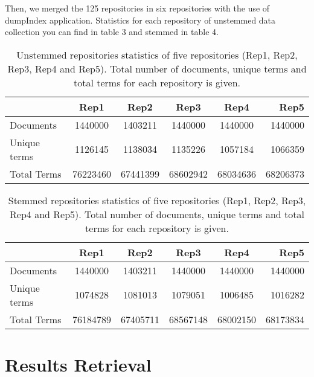 Then, we merged the 125 repositories in six repositories with the use of dumpIndex application. Statistics for each repository of unstemmed data collection you can find in table 3 and stemmed in table 4.




\begin{table}[H]
\begin{center}
\footnotesize
\caption{Unstemmed repositories statistics of five repositories (Rep1, Rep2, Rep3, Rep4 and Rep5). Total number of documents, unique terms and total terms for each repository is given.}
\begin{tabular}{lccccr}
\toprule
&Rep1 & Rep2 & Rep3 & Rep4 & Rep5 \\
\midrule
Documents & 1440000 & 1403211 & 1440000 & 1440000 & 1440000 \\
Unique terms & 1126145 & 1138034 & 1135226 & 1057184 & 1066359\\
Total Terms & 76223460 & 67441399 & 68602942 & 68034636 & 68206373\\
\bottomrule
\end{tabular}
\end{center}
\end{table}



\begin{table}[H]
\begin{center}
\footnotesize
\caption{Stemmed repositories statistics of five repositories (Rep1, Rep2, Rep3, Rep4 and Rep5). Total number of documents, unique terms and total terms for each repository is given.}
\begin{tabular}{lccccr}
\toprule
&Rep1 & Rep2 & Rep3 & Rep4 & Rep5 \\
\midrule
Documents & 1440000 & 1403211 & 1440000 & 1440000 & 1440000 \\
Unique terms & 1074828 & 1081013 & 1079051 & 1006485 & 1016282 \\
Total Terms & 76184789 & 67405711 & 68567148 & 68002150 & 68173834 \\
\bottomrule
\end{tabular}
\end{center}
\end{table}




\section{Results Retrieval}

